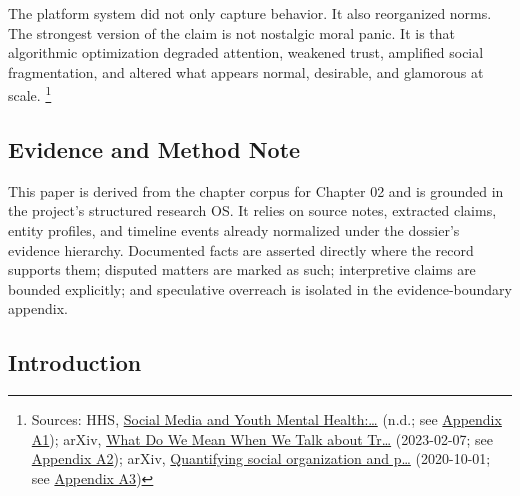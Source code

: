 \documentclass[
  american,
  11pt,
  letterpaper,
]{article}
\begin{document}
The platform system did not only capture behavior. It also reorganized
norms. The strongest version of the claim is not nostalgic moral panic.
It is that algorithmic optimization degraded attention, weakened trust,
amplified social fragmentation, and altered what appears normal,
desirable, and glamorous at scale. \footnote{Sources: HHS,
  \href{https://www.hhs.gov/surgeongeneral/priorities/youth-mental-health/social-media/index.html}{Social
  Media and Youth Mental Health:\ldots{}} (n.d.; see
  \hyperref[appendix-a1-social-media-and-youth-mental-health-the-u-s-surgeon-general-s-advisory]{Appendix
  A1}); arXiv, \href{https://arxiv.org/abs/2302.03671}{What Do We Mean
  When We Talk about Tr\ldots{}} (2023-02-07; see
  \hyperref[appendix-a2-what-do-we-mean-when-we-talk-about-trust-in-social-media-a-systematic-review]{Appendix
  A2}); arXiv, \href{https://arxiv.org/abs/2010.00590}{Quantifying
  social organization and p\ldots{}} (2020-10-01; see
  \hyperref[appendix-a3-quantifying-social-organization-and-political-polarization-in-online-platforms]{Appendix
  A3})}

\subsection{Evidence and Method Note}\label{evidence-and-method-note}

This paper is derived from the chapter corpus for Chapter 02 and is
grounded in the project's structured research OS. It relies on source
notes, extracted claims, entity profiles, and timeline events already
normalized under the dossier's evidence hierarchy. Documented facts are
asserted directly where the record supports them; disputed matters are
marked as such; interpretive claims are bounded explicitly; and
speculative overreach is isolated in the evidence-boundary appendix.

\subsection{Introduction}\label{introduction}
\end{document}
